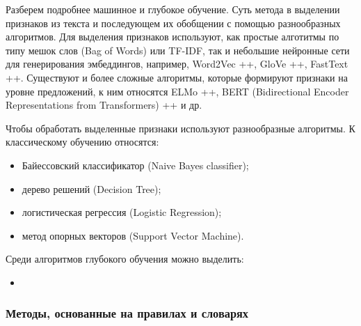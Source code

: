 \bigskip\par
Разберем подробнее машинное и глубокое обучение. Суть метода в выделении признаков из текста и последующем их
обобщении с помощью разнообразных алгоритмов. Для выделения признаков используют, как простые алготитмы по
типу мешок слов (Bag of Words) или TF-IDF, так и небольшие нейронные сети для генерирования эмбеддингов,
например, Word2Vec ++, GloVe ++, FastText ++. Существуют и более сложные алгоритмы, которые формируют признаки
на уровне предложений, к ним относятся ELMo ++, BERT (Bidirectional Encoder Representations from Transformers)
++ и др.

\bigskip\par
Чтобы обработать выделенные признаки используют разнообразные алгоритмы. К классическому обучению относятся:
\bigskip
\begin{itemize}
 \item Байессовский классификатор (Naive Bayes classifier);
 \item дерево решений (Decision Tree);
 \item логистическая регрессия (Logistic Regression);
 \item метод опорных векторов (Support Vector Machine).
\end{itemize}

\bigskip\par
Среди алгоритмов глубокого обучения можно выделить:
\begin{itemize}
 \item
\end{itemize}


\subsubsection{Методы, основанные на правилах и словарях}












































